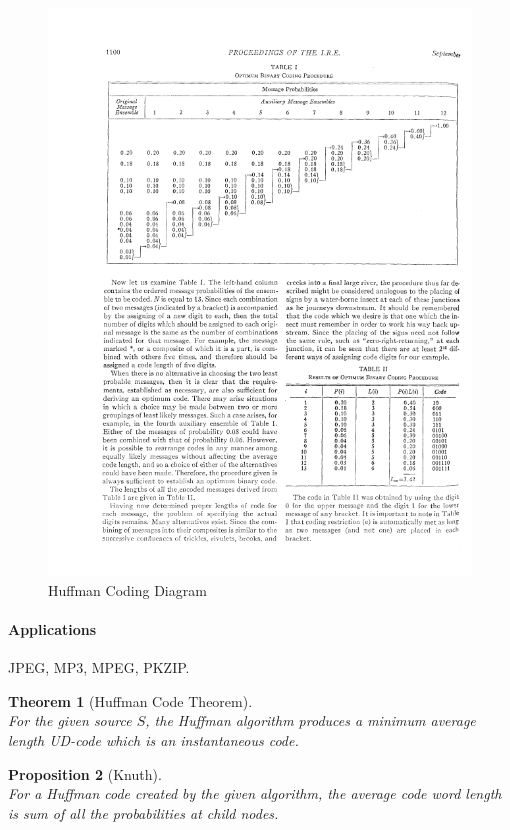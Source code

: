 \documentclass{article}
\newtheorem{theorem}{Theorem}[section]
\newtheorem{proposition}[theorem]{Proposition}
\begin{document}
\begin{figure}[htbp]
    \center
    \includegraphics[scale=1.35]{img/C3_figure_1}
    \caption{Huffman Coding Diagram \cite{Huffman_1952}}
\end{figure}


\paragraph{Applications} JPEG, MP3, MPEG, PKZIP.

\begin{theorem}[Huffman Code Theorem]
    \mbox{}\\
    For the given source $S$, the Huffman algorithm produces a minimum average length UD-code which is an instantaneous code.
\end{theorem}

\begin{proposition}[Knuth]
    \mbox{}\\
    For a Huffman code created by the given algorithm, the average code word length is sum of all the probabilities at child nodes.
\end{proposition}
\end{document}
